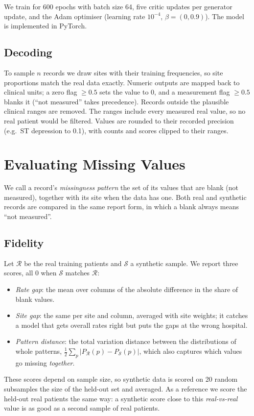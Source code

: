\documentclass[runningheads]{llncs}
\begin{document}
We train for 600 epochs with batch size 64, five critic updates per
generator update, and the Adam optimiser (learning rate $10^{-4}$,
$\beta = (0, 0.9)$). The model is implemented in
PyTorch.

\subsection{Decoding}

To sample $n$ records we draw sites with their training frequencies, so
site proportions match the real data exactly. Numeric outputs are mapped
back to clinical units; a zero flag $\geq 0.5$ sets the value to 0, and a
measurement flag $\geq 0.5$ blanks it (``not measured'' takes precedence).
Records outside the plausible clinical ranges are removed. The ranges
include every measured real value, so no real patient would be
filtered. Values are rounded to their recorded precision (e.g.\ ST
depression to 0.1), with counts and scores clipped to their ranges.

\section{Evaluating Missing Values}
\label{sec:missing-eval}

We call a record's \emph{missingness pattern} the set of its values that are
blank (not measured), together with its site when the data has one. Both
real and synthetic records are compared in the same report form, in which a
blank always means ``not measured''.

\subsection{Fidelity}

Let $\mathcal{R}$ be the real training patients and $\mathcal{S}$ a
synthetic sample. We report three scores, all 0 when $\mathcal{S}$ matches
$\mathcal{R}$:
\begin{itemize}
\item \emph{Rate gap}: the mean over columns of the absolute difference in
  the share of blank values.
\item \emph{Site gap}: the same per site and column, averaged with site
  weights; it catches a model that gets overall rates right but puts the
  gaps at the wrong hospital.
\item \emph{Pattern distance}: the total variation distance between the
  distributions of whole patterns,
  $\tfrac{1}{2}\sum_{p} |P_{\mathcal{R}}(p) - P_{\mathcal{S}}(p)|$, which
  also captures which values go missing \emph{together}.
\end{itemize}
These scores depend on sample size, so synthetic data is scored on 20
random subsamples the size of the held-out set and averaged. As a
reference we score the held-out real patients the same way: a synthetic
score close to this \emph{real-vs-real} value is as good as a second
sample of real patients.
\end{document}
